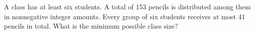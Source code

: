 A class has at least six students. A total of $153$ pencils is distributed among them in nonnegative integer amounts. Every group of six students receives at most $41$ pencils in total. What is the minimum possible class size?
